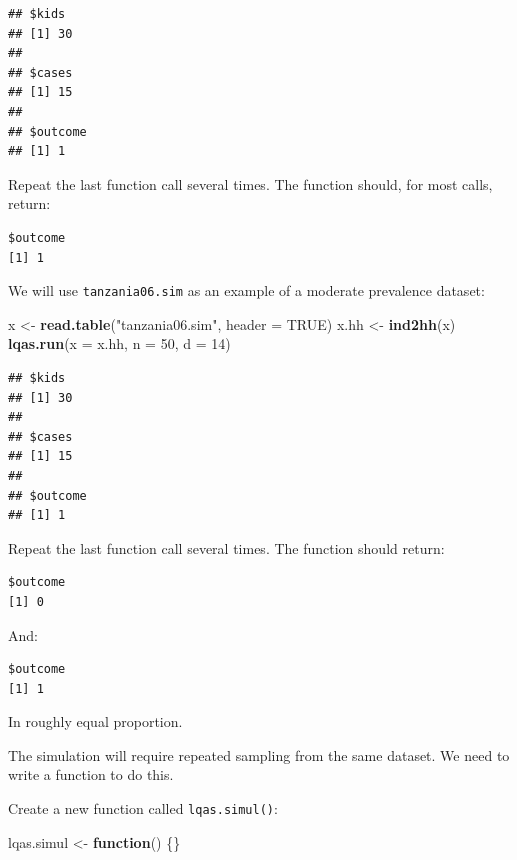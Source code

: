 \documentclass[12pt,a4paper]{book}
\newenvironment{Shaded}{\begin{snugshade}}{\end{snugshade}}
\newcommand{\ControlFlowTok}[1]{\textcolor[rgb]{0.13,0.29,0.53}{\textbf{#1}}}
\newcommand{\DataTypeTok}[1]{\textcolor[rgb]{0.13,0.29,0.53}{#1}}
\newcommand{\DecValTok}[1]{\textcolor[rgb]{0.00,0.00,0.81}{#1}}
\newcommand{\KeywordTok}[1]{\textcolor[rgb]{0.13,0.29,0.53}{\textbf{#1}}}
\newcommand{\NormalTok}[1]{#1}
\newcommand{\OtherTok}[1]{\textcolor[rgb]{0.56,0.35,0.01}{#1}}
\newcommand{\StringTok}[1]{\textcolor[rgb]{0.31,0.60,0.02}{#1}}
\theoremstyle{definition}
\theoremstyle{definition}
\theoremstyle{definition}
\theoremstyle{remark}
\begin{document}
\begin{verbatim}
## $kids
## [1] 30
## 
## $cases
## [1] 15
## 
## $outcome
## [1] 1
\end{verbatim}

Repeat the last function call several times. The function should, for
most calls, return:

\begin{verbatim}
$outcome
[1] 1
\end{verbatim}

We will use \texttt{tanzania06.sim} as an example of a moderate
prevalence dataset:

\begin{Shaded}
\begin{Highlighting}[]
\NormalTok{x <-}\StringTok{ }\KeywordTok{read.table}\NormalTok{(}\StringTok{"tanzania06.sim"}\NormalTok{, }\DataTypeTok{header =} \OtherTok{TRUE}\NormalTok{)}
\NormalTok{x.hh <-}\StringTok{ }\KeywordTok{ind2hh}\NormalTok{(x)}
\KeywordTok{lqas.run}\NormalTok{(}\DataTypeTok{x =}\NormalTok{ x.hh, }\DataTypeTok{n =} \DecValTok{50}\NormalTok{, }\DataTypeTok{d =} \DecValTok{14}\NormalTok{)}
\end{Highlighting}
\end{Shaded}

\begin{verbatim}
## $kids
## [1] 30
## 
## $cases
## [1] 15
## 
## $outcome
## [1] 1
\end{verbatim}

Repeat the last function call several times. The function should return:

\begin{verbatim}
$outcome
[1] 0
\end{verbatim}

And:

\begin{verbatim}
$outcome
[1] 1
\end{verbatim}

In roughly equal proportion.

The simulation will require repeated sampling from the same dataset. We
need to write a function to do this.

Create a new function called \texttt{lqas.simul()}:

\begin{Shaded}
\begin{Highlighting}[]
\NormalTok{lqas.simul <-}\StringTok{ }\ControlFlowTok{function}\NormalTok{() \{\}}
\end{Highlighting}
\end{Shaded}
\end{document}
